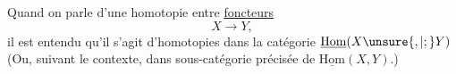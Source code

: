Quand on parle d'une homotopie entre \uline{foncteurs}
\[X\longrightarrow Y,\]
il est entendu qu'il s'agit d'homotopies dans la catégorie $\underline{\mathrm{Hom}}(X\unsure{,|;}Y)$ (Ou, suivant le contexte, dans  sous-catégorie précisée de $\underline{\mathrm{Hom}}(X,Y)$.)
